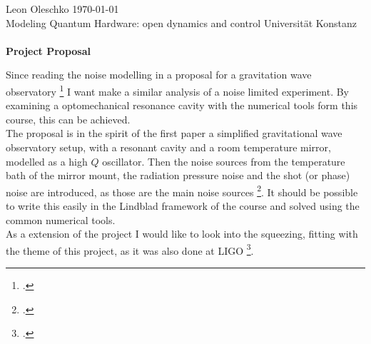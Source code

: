 \documentclass[
	a4page,
	parskip=full
]{scrartcl}
\begin{document}
{
	\sffamily\noindent
	Leon Oleschko \hfill \today\\
	Modeling Quantum Hardware: open dynamics and control \hfill Universität Konstanz\\
	\vspace*{.1cm}\\
	\textbf{\huge Project Proposal}
}

Since reading the noise modelling in a proposal for a gravitation wave observatory \footcite{rainer_weiss_electronically_1972}
I want make a similar analysis of a noise limited experiment.
By examining a optomechanical resonance cavity with the numerical tools form this course, this can be achieved.\\
The proposal is in the spirit of the first paper a simplified gravitational wave observatory setup, with a resonant cavity and a room temperature mirror, modelled as a high $Q$ oscillator.
Then the noise sources from the temperature bath of the mirror mount, the radiation pressure noise and the shot (or phase) noise are introduced, as those are the main noise sources \footcite{aspelmeyer_cavity_2014-1}.
It should be possible to write this easily in the Lindblad framework of the course and solved using the common numerical tools.\\
As a extension of the project I would like to look into the squeezing, 
fitting with the theme of this project, as it was also done at LIGO \footcite{yu_quantum_2020}.



\end{document}
